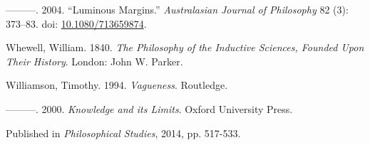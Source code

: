 \documentclass[
  11pt,
  letterpaper,
  DIV=11,
  numbers=noendperiod,
  twoside]{scrartcl}
\newlength{\cslhangindent}
\newenvironment{CSLReferences}[2] %
 {\begin{list}{}{%
  \setlength{\itemindent}{0pt}
  \setlength{\leftmargin}{0pt}
  \setlength{\parsep}{0pt}
  \ifodd #1
   \setlength{\leftmargin}{\cslhangindent}
   \setlength{\itemindent}{-1\cslhangindent}
  \fi
  \setlength{\itemsep}{#2\baselineskip}}}
 {\end{list}}
\begin{document}
\begin{CSLReferences}{1}{0}
---------. 2004. {``Luminous Margins.''} \emph{Australasian Journal of
Philosophy} 82 (3): 373--83. doi:
\href{https://doi.org/10.1080/713659874}{10.1080/713659874}.

Whewell, William. 1840. \emph{The Philosophy of the Inductive Sciences,
Founded Upon Their History}. London: John W. Parker.

Williamson, Timothy. 1994. \emph{{Vagueness}}. Routledge.

---------. 2000. \emph{{Knowledge and its Limits}}. Oxford University
Press.

\end{CSLReferences}



\noindent Published in\emph{
Philosophical Studies}, 2014, pp. 517-533.
\end{document}
